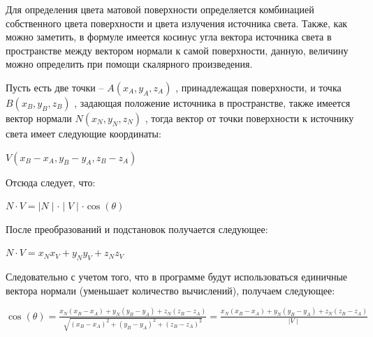 \documentclass[a4paper,14pt]{extreport}
\begin{document}
		Для определения цвета матовой поверхности определяется комбинацией
собственного цвета поверхности и цвета излучения источника света. Также, как
можно заметить, в формуле имеется косинус угла вектора источника света в
пространстве между вектором нормали к самой поверхности, данную, величину
можно определить при помощи скалярного произведения.
		\par Пусть есть две точки --
		\begin{math}
		A(x_A, y_A, z_A)
		\end{math}
		, принадлежащая поверхности, и точка
		\begin{math}
		B(x_B, y_B, z_B)
		\end{math}
		, задающая положение источника в пространстве, также имеется
		вектор нормали
		\begin{math}
		N(x_N, y_N, z_N)
		\end{math}
		, тогда вектор от точки поверхности к источнику
		света имеет следующие координаты:
		\begin{center}
		\begin{math}
		V(x_B - x_A, y_B - y_A, z_B - z_A)
		\end{math}
		\end{center}
		Отсюда следует, что:
		\begin{center}
		\begin{math}
		N \cdot V =\mid N\mid \cdot \mid V \mid\cdot \cos (\theta)
		\end{math}
		\end{center}
		После преобразований и подстановок получается следующее:
		\begin{center}
		\begin{math}
		N \cdot V = x_N x_V + y_N y_V + z_N z_V
		\end{math}
		\end{center}
		Следовательно с учетом того, что в программе будут использоваться
единичные вектора нормали (уменьшает количество вычислений), получаем
следующее:
		\begin{center}
		\begin{math}
		\cos (\theta) = \frac{
		x_N(x_B - x_A)+y_N(y_B-y_A)+z_N(z_B-z_A)
  		}{
  		\sqrt{(x_B - x_A)^2 + (y_B - y_A)^2 + (z_B - z_A)^2}
		} = \frac{
		x_N(x_B - x_A)+y_N(y_B-y_A)+z_N(z_B-z_A)
  		}{
  		\mid V \mid
		}
		\end{math}
		\end{center}
\end{document}

